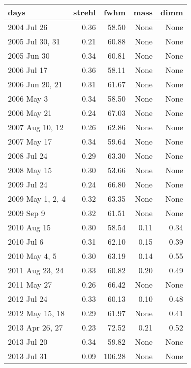 \begin{tabular}{lrrrr}
\toprule
                  days &  strehl &    fwhm &  mass &  dimm \\
\midrule
           2004 Jul 26 &    0.36 &   58.50 &  None &  None \\
       2005 Jul 30, 31 &    0.21 &   60.88 &  None &  None \\
           2005 Jun 30 &    0.34 &   60.81 &  None &  None \\
           2006 Jul 17 &    0.36 &   58.11 &  None &  None \\
       2006 Jun 20, 21 &    0.31 &   61.67 &  None &  None \\
            2006 May 3 &    0.34 &   58.50 &  None &  None \\
           2006 May 21 &    0.24 &   67.03 &  None &  None \\
       2007 Aug 10, 12 &    0.26 &   62.86 &  None &  None \\
           2007 May 17 &    0.34 &   59.64 &  None &  None \\
           2008 Jul 24 &    0.29 &   63.30 &  None &  None \\
           2008 May 15 &    0.30 &   53.66 &  None &  None \\
           2009 Jul 24 &    0.24 &   66.80 &  None &  None \\
      2009 May 1, 2, 4 &    0.32 &   63.35 &  None &  None \\
            2009 Sep 9 &    0.32 &   61.51 &  None &  None \\
           2010 Aug 15 &    0.30 &   58.54 &  0.11 &  0.34 \\
            2010 Jul 6 &    0.31 &   62.10 &  0.15 &  0.39 \\
         2010 May 4, 5 &    0.30 &   63.19 &  0.14 &  0.55 \\
       2011 Aug 23, 24 &    0.33 &   60.82 &  0.20 &  0.49 \\
           2011 May 27 &    0.26 &   66.42 &  None &  None \\
           2012 Jul 24 &    0.33 &   60.13 &  0.10 &  0.48 \\
       2012 May 15, 18 &    0.29 &   61.97 &  None &  0.41 \\
       2013 Apr 26, 27 &    0.23 &   72.52 &  0.21 &  0.52 \\
           2013 Jul 20 &    0.34 &   59.82 &  None &  None \\
           2013 Jul 31 &    0.09 &  106.28 &  None &  None \\

\end{tabular}

